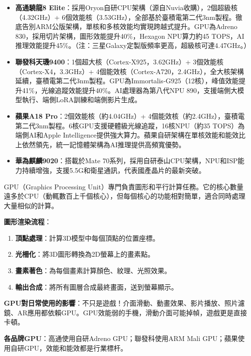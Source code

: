 \begin{itemize}
  \item \textbf{高通驍龍8 Elite}：採用Oryon自研CPU架構（源自Nuvia收購），2個超級核（4.32GHz）+ 6個效能核（3.53GHz），全部基於臺積電第二代3nm製程。徹底告別ARM公版架構，單核和多核效能均實現跨越式提升。GPU為Adreno 830，採用切片架構，圖形效能提升40\%，Hexagon NPU算力約45 TOPS，AI推理效能提升45\%。（注：三星Galaxy定製版頻率更高，超級核可達4.47GHz。）
  \item \textbf{聯發科天璣9400}：1個超大核（Cortex-X925，3.62GHz）+ 3個效能核（Cortex-X4，3.3GHz）+ 4個能效核（Cortex-A720，2.4GHz），全大核架構延續，臺積電第二代3nm製程。GPU為Immortalis-G925（12核），峰值效能提升41\%，光線追蹤效能提升40\%。AI處理器為第八代NPU 890，支援端側大模型執行、端側LoRA訓練和端側影片生成。
  \item \textbf{蘋果A18 Pro}：2個效能核（約4.04GHz）+ 4個能效核（約2.4GHz），臺積電第二代3nm製程。6核GPU支援硬體級光線追蹤，16核NPU（約35 TOPS）為端側AI和Apple Intelligence提供強大算力。蘋果自研架構在單核效能和能效比上依然領先，統一記憶體架構為AI推理提供高頻寬優勢。
  \item \textbf{華為麒麟9020}：搭載於Mate 70系列，採用自研泰山CPU架構，NPU和ISP能力持續增強，支援5.5G和衛星通訊，代表國產晶片的最新突破。
\end{itemize}


GPU（Graphics Processing Unit）專門負責圖形和平行計算任務。它的核心數量遠多於CPU（動輒數百上千個核心），但每個核心的功能相對簡單，適合同時處理大量相似的計算。

\textbf{圖形渲染流程}：

\begin{enumerate}
  \item \textbf{頂點處理}：計算3D模型中每個頂點的位置座標。
  \item \textbf{光柵化}：將3D圖形轉換為2D螢幕上的畫素點。
  \item \textbf{畫素著色}：為每個畫素計算顏色、紋理、光照效果。
  \item \textbf{輸出合成}：將所有圖層合成最終畫面，送到螢幕顯示。
\end{enumerate}

\textbf{GPU對日常使用的影響}：不只是遊戲！介面滑動、動畫效果、影片播放、照片濾鏡、AR應用都依賴GPU。GPU效能弱的手機，滑動介面可能掉幀，遊戲更是直接卡頓。

\textbf{各品牌GPU}：高通使用自研Adreno GPU；聯發科使用ARM Mali GPU；蘋果使用自研GPU，效能和能效都是行業標杆。

